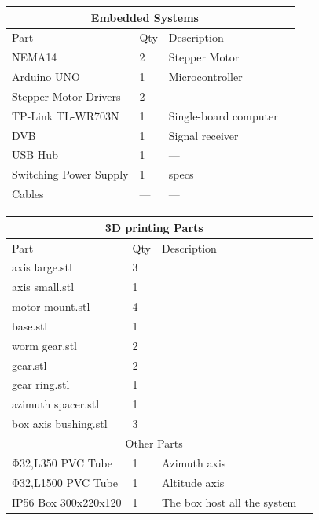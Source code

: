 \documentclass[a4paper]{article}
\begin{document}
\begin{center}
	\begin{tabular}{ | l | l | l | l |}
	\hline
 	\multicolumn{3}{|c|}{Embedded Systems} \\
 	\hline
	Part & Qty & Description \\ \hline
	NEMA14& 2 & Stepper Motor \\ \hline
	Arduino UNO & 1 & Microcontroller \\ \hline
	Stepper Motor Drivers & 2 & \\ \hline
 	TP-Link TL-WR703N & 1 & Single-board computer \\ \hline
	DVB & 1 & Signal receiver \\ \hline
	USB Hub & 1 & ---\\ \hline
	Switching Power Supply & 1 & specs\\ \hline
	Cables & --- & ---\\ \hline
    	\end{tabular}
\end{center}

\vspace{0.5cm}

\begin{center}
	\begin{tabular}{ | l | l | l | l |}
	\hline
 	\multicolumn{3}{|c|}{3D printing Parts} \\
 	\hline
	Part & Qty & Description \\ \hline
	axis large.stl & 3 & \\ \hline
	axis small.stl & 1 & \\ \hline
	motor mount.stl & 4 & \\ \hline
 	base.stl & 1 & \\ \hline
	worm gear.stl & 2 &\\ \hline
	gear.stl & 2 &\\ \hline
	gear ring.stl & 1 &\\ \hline
	azimuth spacer.stl & 1 &\\ \hline
	box axis bushing.stl & 3 &\\ \hline
 	\multicolumn{3}{|c|}{Other Parts} \\
 	\hline
	Φ32,L350 PVC Tube & 1 & Azimuth axis\\ \hline
	Φ32,L1500 PVC Tube & 1 & Altitude axis\\ \hline
	IP56 Box 300x220x120 & 1 & The box host all the system\\ \hline
    	\end{tabular}
\end{center}
\end{document}
